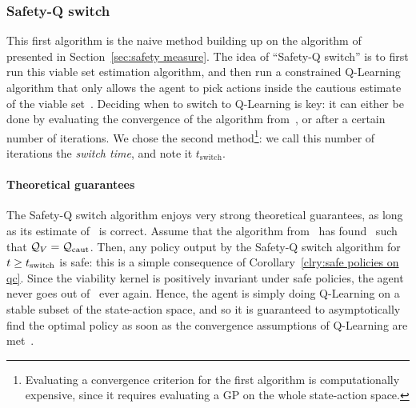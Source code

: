 \subsubsection{Safety-Q switch}
This first algorithm is the naive method building up on the algorithm of~\textcite{heim2020learnable} presented in Section~\ref{sec:safety measure}. The idea of \enquote{Safety-Q switch} is to first run this viable set estimation algorithm, and then run a constrained Q-Learning algorithm that only allows the agent to pick actions inside the cautious estimate of the viable set~\Qcaut. Deciding when to switch to Q-Learning is key: it can either be done by evaluating the convergence of the algorithm from~\cite{heim2020learnable}, or after a certain number of iterations. We chose the second method\footnote{Evaluating a convergence criterion for the first algorithm is computationally expensive, since it requires evaluating a GP on the whole state-action space.}: we call this number of iterations the \emph{ switch time}, and note it $t_\text{switch}$.%
\paragraph{Theoretical guarantees} The Safety-Q switch algorithm enjoys very strong theoretical guarantees, as long as its estimate of \QV~is correct. Assume that the algorithm from~\cite{heim2020learnable} has found \Qcaut~such that $\mathcal{Q}_{V} = \mathcal{Q}_\text{caut}$. Then, any policy output by the Safety-Q switch algorithm for $t \geq t_\text{switch}$ is safe: this is a simple consequence of Corollary~\ref{clry:safe policies on qc}. Since the viability kernel is positively invariant under safe policies, the agent never goes out of \QV~ever again. Hence, the agent is simply doing Q-Learning on a stable subset of the state-action space, and so it is guaranteed to asymptotically find the optimal policy as soon as the convergence assumptions of Q-Learning are met~\cite{sutton2018reinforcement}.

